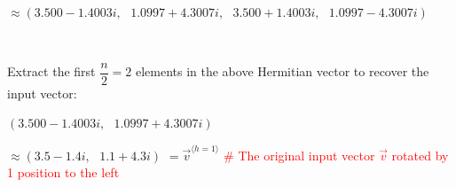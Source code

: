 $ $

$ \approx (3.500 - 1.4003i, \text{ } 1.0997 + 4.3007i,\text{ } 3.500 + 1.4003i, \text{ } 1.0997 - 4.3007i)$

$ $

Extract the first $\dfrac{n}{2} = 2$ elements in the above Hermitian vector to recover the input vector:

$(3.500 - 1.4003i, \text{ } 1.0997 + 4.3007i)$

$ \approx (3.5 - 1.4i, \text{ } 1.1 + 4.3i)$
$ = \vec{v}^{\langle h=1 \rangle}$ \textcolor{red}{\text{ } \# The original input vector $\vec{v}$ rotated by 1 position to the left}

